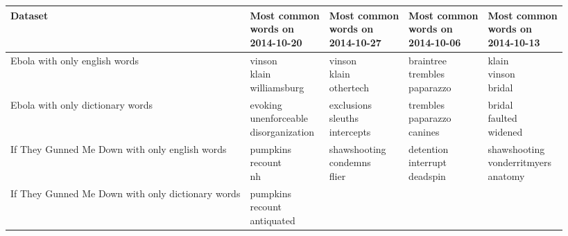 \documentclass[11pt, oneside]{article}
\makeatletter
\newcommand{\specialcell}[2][c]{%
  \begin{tabular}[#1]{@{}c@{}}#2\end{tabular}}
\makeatother
\begin{document}
\begin{enumerate}
\begin{tabularx}{\textwidth}{X|l|l|l|l}
\textbf{Dataset} & \specialcell{Most common\\words on \\\textbf{2014-10-20}} & \specialcell{Most common\\words on \\\textbf{2014-10-27}} & \specialcell{Most common\\words on \\\textbf{2014-10-06}} & \specialcell{Most common\\words on\\\textbf{2014-10-13}} \\
\hline Ebola with only english words & 
\specialcell{vinson\\klain\\williamsburg} & 
\specialcell{vinson\\klain\\othertech} & 
\specialcell{braintree\\trembles\\paparazzo} & 
\specialcell{klain\\vinson\\bridal} \\ 
\hline Ebola with only dictionary words & 
\specialcell{evoking\\unenforceable\\disorganization} & 
\specialcell{exclusions\\sleuths\\intercepts} & 
\specialcell{trembles\\paparazzo\\canines} &
 \specialcell{bridal\\faulted\\widened}  \\ 
\hline If They Gunned Me Down with only english words & 
\specialcell{pumpkins\\recount\\nh} & 
\specialcell{shawshooting\\condemns\\flier} & 
\specialcell{detention\\interrupt\\deadspin} & 
\specialcell{shawshooting\\vonderritmyers\\anatomy} \\ 
\hline If They Gunned Me Down with only dictionary words & 
\specialcell{pumpkins\\recount\\antiquated} & 

\end{tabularx}
\end{enumerate}
\end{document}
